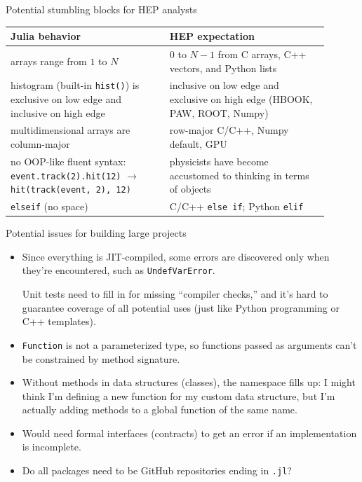 \documentclass{beamer}
\begin{document}
\begin{frame}{Potential stumbling blocks for HEP analysts}
\vspace{0.4 cm}
\renewcommand{\arraystretch}{1.2}
\begin{tabular}{>{\raggedright}p{0.45\linewidth} >{\raggedright\arraybackslash}p{0.45\linewidth}}
{\bf Julia behavior} & {\bf HEP expectation} \\\hline
arrays range from $1$ to $N$ & $0$ to $N-1$ from C arrays, C++ vectors, and Python lists \\\hline
histogram (built-in {\tt \scriptsize hist()}) is exclusive on low edge and inclusive on high edge & inclusive on low edge and exclusive on high edge (HBOOK, PAW, ROOT, Numpy) \\\hline
multidimensional arrays are column-major & row-major C/C++, Numpy default, GPU \\\hline
no OOP-like fluent syntax: {\tt \scriptsize event.track(2).hit(12)} $\to$ {\tt \scriptsize hit(track(event, 2), 12)} & physicists have become accustomed to thinking in terms of objects \\\hline
{\tt \scriptsize elseif} (no space) & C/C++ {\tt \scriptsize else if}; Python {\tt \scriptsize elif}
\end{tabular}
\end{frame}

\begin{frame}{Potential issues for building large projects}
\vspace{0.4 cm}
\begin{itemize}
  \item Since everything is JIT-compiled, some errors are discovered only when they're encountered, such as {\tt \small UndefVarError}.

\vspace{0.2 cm}
Unit tests need to fill in for missing ``compiler checks,'' and it's hard to guarantee coverage of all potential uses (just like Python programming or C++ templates).

  \item {\tt \small Function} is not a parameterized type, so functions passed as arguments can't be constrained by method signature.

  \item Without methods in data structures (classes), the namespace fills up: I might think I'm defining a new function for my custom data structure, but I'm actually adding methods to a global function of the same name.

  \item Would need formal interfaces (contracts) to get an error if an implementation is incomplete.

  \item Do all packages need to be GitHub repositories ending in {\tt \small .jl}?
\end{itemize}
\end{frame}
\end{document}
